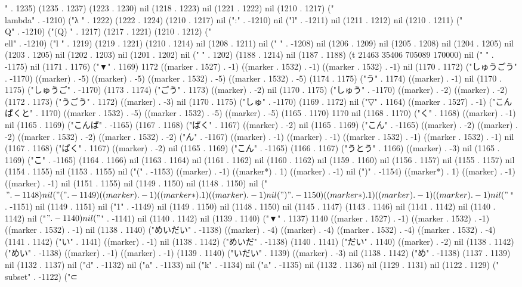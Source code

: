 " . 1235) (1235 . 1237) (1223 . 1230) nil (1218 . 1223) nil (1221 . 1222) nil (1210 . 1217) ("\\lambda" . -1210) ("λ
" . 1222) (1222 . 1224) (1210 . 1217) nil (":" . -1210) nil ("l" . -1211) nil (1211 . 1212) nil (1210 . 1211) ("\\Q" . -1210) ("(Q)
" . 1217) (1217 . 1221) (1210 . 1212) ("\\ell" . -1210) ("l
" . 1219) (1219 . 1221) (1210 . 1214) nil (1208 . 1211) nil (" " . -1208) nil (1206 . 1209) nil (1205 . 1208) nil (1204 . 1205) nil (1203 . 1205) nil (1202 . 1203) nil (1201 . 1202) nil (" " . 1202) (1188 . 1214) nil (1187 . 1188) (t 21463 35406 705089 170000) nil (" " . -1175) nil (1171 . 1176) ("▼" . 1169) 1172 ((marker . 1527) . -1) ((marker . 1532) . -1) ((marker . 1532) . -1) nil (1170 . 1172) ("しゅうごう" . -1170) ((marker) . -5) ((marker) . -5) ((marker . 1532) . -5) ((marker . 1532) . -5) (1174 . 1175) ("う" . 1174) ((marker) . -1) nil (1170 . 1175) ("しゅうご" . -1170) (1173 . 1174) ("ごう" . 1173) ((marker) . -2) nil (1170 . 1175) ("しゅう" . -1170) ((marker) . -2) ((marker) . -2) (1172 . 1173) ("うごう" . 1172) ((marker) . -3) nil (1170 . 1175) ("しゅ" . -1170) (1169 . 1172) nil ("▽" . 1164) ((marker . 1527) . -1) ("こんぱくと" . 1170) ((marker . 1532) . -5) ((marker . 1532) . -5) ((marker) . -5) (1165 . 1170) 1170 nil (1168 . 1170) ("く" . 1168) ((marker) . -1) nil (1165 . 1169) ("こんぱ" . -1165) (1167 . 1168) ("ぱく" . 1167) ((marker) . -2) nil (1165 . 1169) ("こん" . -1165) ((marker) . -2) ((marker) . -2) ((marker . 1532) . -2) ((marker . 1532) . -2) ("ん" . -1167) ((marker) . -1) ((marker) . -1) ((marker . 1532) . -1) ((marker . 1532) . -1) nil (1167 . 1168) ("ぱく" . 1167) ((marker) . -2) nil (1165 . 1169) ("こん" . -1165) (1166 . 1167) ("うとう" . 1166) ((marker) . -3) nil (1165 . 1169) ("こ" . -1165) (1164 . 1166) nil (1163 . 1164) nil (1161 . 1162) nil (1160 . 1162) nil (1159 . 1160) nil (1156 . 1157) nil (1155 . 1157) nil (1154 . 1155) nil (1153 . 1155) nil ("(" . -1153) ((marker) . -1) ((marker*) . 1) ((marker) . -1) nil (")" . -1154) ((marker*) . 1) ((marker) . -1) ((marker) . -1) nil (1151 . 1155) nil (1149 . 1150) nil (1148 . 1150) nil ("$" . -1148) nil ("(" . -1149) ((marker) . -1) ((marker*) . 1) ((marker) . -1) nil (")" . -1150) ((marker*) . 1) ((marker) . -1) ((marker) . -1) nil ("$" . -1151) nil (1149 . 1151) nil ("1" . -1149) nil (1149 . 1150) nil (1148 . 1150) nil (1145 . 1147) (1143 . 1146) nil (1141 . 1142) nil (1140 . 1142) nil ("$" . -1140) nil ("$" . -1141) nil (1140 . 1142) nil (1139 . 1140) ("▼" . 1137) 1140 ((marker . 1527) . -1) ((marker . 1532) . -1) ((marker . 1532) . -1) nil (1138 . 1140) ("めいだい" . -1138) ((marker) . -4) ((marker) . -4) ((marker . 1532) . -4) ((marker . 1532) . -4) (1141 . 1142) ("い" . 1141) ((marker) . -1) nil (1138 . 1142) ("めいだ" . -1138) (1140 . 1141) ("だい" . 1140) ((marker) . -2) nil (1138 . 1142) ("めい" . -1138) ((marker) . -1) ((marker) . -1) (1139 . 1140) ("いだい" . 1139) ((marker) . -3) nil (1138 . 1142) ("め" . -1138) (1137 . 1139) nil (1132 . 1137) nil ("d" . -1132) nil ("a" . -1133) nil ("k" . -1134) nil ("a" . -1135) nil (1132 . 1136) nil (1129 . 1131) nil (1122 . 1129) ("\\subset" . -1122) ("⊂
